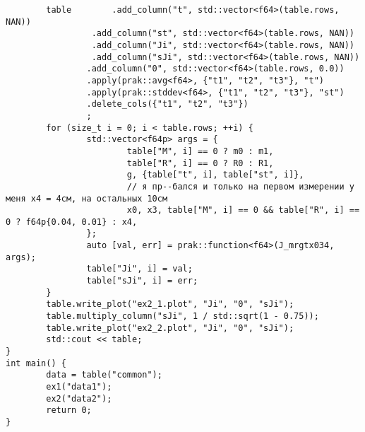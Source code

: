 \documentclass{article}
\begin{document}
\begin{verbatim}
        table        .add_column("t", std::vector<f64>(table.rows, NAN))
                 .add_column("st", std::vector<f64>(table.rows, NAN))
                 .add_column("Ji", std::vector<f64>(table.rows, NAN))
                 .add_column("sJi", std::vector<f64>(table.rows, NAN))
                .add_column("0", std::vector<f64>(table.rows, 0.0))
                .apply(prak::avg<f64>, {"t1", "t2", "t3"}, "t")
                .apply(prak::stddev<f64>, {"t1", "t2", "t3"}, "st")
                .delete_cols({"t1", "t2", "t3"})
                ;
        for (size_t i = 0; i < table.rows; ++i) {
                std::vector<f64p> args = {
                        table["M", i] == 0 ? m0 : m1, 
                        table["R", i] == 0 ? R0 : R1,
                        g, {table["t", i], table["st", i]},
                        // я пр--бался и только на первом измерении у меня x4 = 4см, на остальных 10см
                        x0, x3, table["M", i] == 0 && table["R", i] == 0 ? f64p{0.04, 0.01} : x4,
                };
                auto [val, err] = prak::function<f64>(J_mrgtx034, args);
                table["Ji", i] = val;
                table["sJi", i] = err;
        }
        table.write_plot("ex2_1.plot", "Ji", "0", "sJi");
        table.multiply_column("sJi", 1 / std::sqrt(1 - 0.75));
        table.write_plot("ex2_2.plot", "Ji", "0", "sJi");
        std::cout << table;
}
int main() {
        data = table("common");
        ex1("data1");
        ex2("data2");
        return 0;
}\end{verbatim}

\newpage
\end{document}
